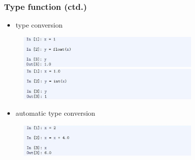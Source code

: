 \documentclass[14pt]{beamer}
\begin{document}
\begin{frame}[fragile]

\frametitle{Type function (ctd.)}

\vspace*{-3mm}
\begin{itemize}
	\item type conversion
\end{itemize}
\vspace*{-3mm}
\begin{figure}[ht]
	\centering
	\includegraphics[width=0.8\textwidth]{figures/LLp43b}
	\includegraphics[width=0.8\textwidth]{figures/LLp43c}
\end{figure}

\begin{itemize}
	\item automatic type conversion
\end{itemize}
\vspace*{-3mm}
\begin{figure}[ht]
	\centering
	\includegraphics[width=0.8\textwidth]{figures/LLp43d}
\end{figure}

\end{frame}

%
%
%
%
%
%
%

\end{document}
